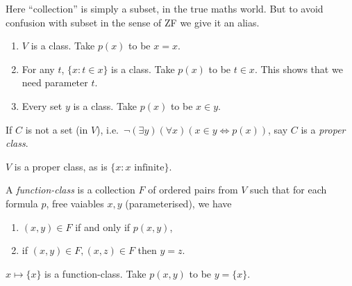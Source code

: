 \documentclass[a4paper]{article}
\begin{document}
Here ``collection'' is simply a subset, in the true maths world. But to avoid confusion with subset in the sense of ZF we give it an alias.

\begin{eg}\leavevmode
  \begin{enumerate}
  \item \(V\) is a class. Take \(p(x)\) to be \(x = x\).
  \item For any \(t\), \(\{x: t \in x\}\) is a class. Take \(p(x)\) to be \(t \in x\). This shows that we need parameter \(t\).
  \item Every set \(y\) is a class. Take \(p(x)\) to be \(x \in y\).
  \end{enumerate}
\end{eg}

\begin{definition}
  If \(C\) is not a set (in \(V\)), i.e.\ \(\neg (\exists y) (\forall x) (x \in y \iff p(x))\), say \(C\) is a \emph{proper class}.
\end{definition}

\begin{eg}
  \(V\) is a proper class, as is \(\{x: x \text{ infinite}\}\).
\end{eg}

\begin{definition}
  A \emph{function-class} is a collection \(F\) of ordered pairs from \(V\) such that for each formula \(p\), free vaiables \(x, y\) (parameterised), we have
  \begin{enumerate}
  \item \((x, y) \in F\) if and only if \(p(x, y)\),
  \item if \((x, y) \in F, (x, z) \in F\) then \(y = z\).
  \end{enumerate}
\end{definition}

\begin{eg}
  \(x \mapsto \{x\}\) is a function-class. Take \(p(x, y)\) to be \(y = \{x\}\).
\end{eg}

\printindex
\end{document}
